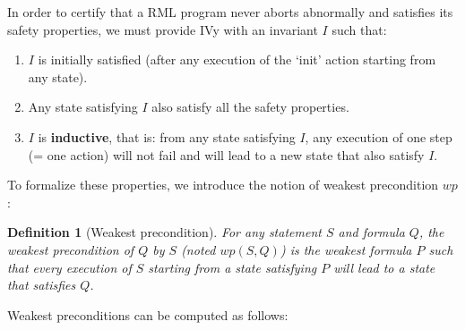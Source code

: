 \documentclass[11pt,a4paper,oldfontcommands,openany]{memoir}
\newtheorem*{definition}{Definition}
\begin{document}
    In order to certify that a RML program never aborts abnormally and satisfies its safety properties, we must provide IVy with an invariant \(I\) such that:
    \begin{enumerate}
        \item \(I\) is initially satisfied (after any execution of the `init' action starting from any state).
        \item Any state satisfying \(I\) also satisfy all the safety properties.
        \item \(I\) is \textbf{inductive}, that is: from any state satisfying \(I\), any execution of one step (= one action) will not fail and
        will lead to a new state that also satisfy \(I\). 
    \end{enumerate}

    To formalize these properties, we introduce the notion of weakest precondition \(wp\):
    \begin{definition}[Weakest precondition]
        For any statement \(S\) and formula \(Q\), the weakest precondition of \(Q\) by \(S\) (noted \(wp(S,Q)\)) is the weakest formula \(P\) such that
        every execution of \(S\) starting from a state satisfying \(P\) will lead to a state that satisfies \(Q\).
    \end{definition}

    Weakest preconditions can be computed as follows\cite{Padon:2016:ISV:2908080.2908118}:\\
\end{document}
